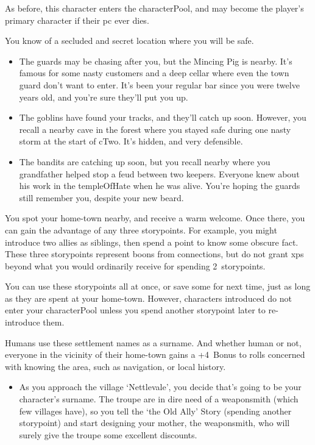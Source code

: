 \begin{multicols}{2}
As before, this character enters the \gls{characterPool}, and may become the player's primary character if their \gls{pc} ever dies.

You know of a secluded and secret location where you will be safe.

\begin{itemize}
  \item
  The guards may be chasing after you, but the Mincing Pig is nearby.  It's famous for some nasty customers and a deep cellar where even the town guard don't want to enter.
  It's been your regular bar since you were twelve years old, and you're sure they'll put you up.
  \item
  The goblins have found your tracks, and they'll catch up soon.
  However, you recall a nearby cave in the forest where you stayed safe during one nasty \gls{storm} at the start of \gls{cTwo}.
  It's hidden, and very defensible.
  \item
  The bandits are catching up soon, but you recall  nearby where you grandfather helped stop a feud between two \glspl{keeper}.
  Everyone knew about his work in the \gls{templeOfHate} when he was alive.
  You're hoping the guards still remember you, despite your new beard.
\end{itemize}

You spot your home-town nearby, and receive a warm welcome.
Once there, you can gain the advantage of any three \glspl{storypoint}.
For example, you might introduce two allies as siblings, then spend a point to know some obscure fact.
These three \glspl{storypoint} represent boons from connections, but do not grant \glspl{xp} beyond what you would ordinarily receive for spending 2~\glspl{storypoint}.

You can use these \glspl{storypoint} all at once, or save some for next time, just as long as they are spent at your home-town.
However, characters introduced do not enter your \gls{characterPool} unless you spend another \gls{storypoint} later to re-introduce them.

Humans use these settlement names as a surname.
And whether human or not, everyone in the vicinity of their home-town gains a +4~Bonus to rolls concerned with knowing the area, such as \gls{navigation}, or local history.

\begin{itemize}
  \item
  As you approach the \gls{village} `Nettlevale', you decide that's going to be your character's surname.
  The troupe are in dire need of a weaponsmith (which few \glspl{village} have), so you tell the `the Old Ally' Story (spending another \gls{storypoint}) and start designing your mother, the weaponsmith, who will surely give the troupe some excellent discounts.


\end{itemize}
\end{multicols}
